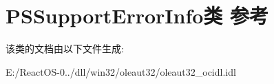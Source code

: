 \hypertarget{class_p_s_support_error_info}{}\section{P\+S\+Support\+Error\+Info类 参考}
\label{class_p_s_support_error_info}


该类的文档由以下文件生成\+:\begin{DoxyCompactItemize}
\item 
E\+:/\+React\+O\+S-\/0../dll/win32/oleaut32/oleaut32\+\_\+ocidl.\+idl\end{DoxyCompactItemize}
